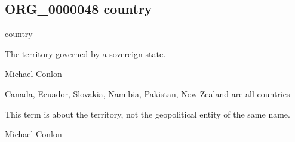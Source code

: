 \documentclass[letterpaper,10pt,english]{sphinxmanual}
\begin{document}
\subsection{ORG\_0000048 \sphinxhyphen{} country}
\label{\detokenize{doc-ORG_0000048:org-0000048-country}}\label{\detokenize{doc-ORG_0000048:index-0}}\label{\detokenize{doc-ORG_0000048::doc}}
\begin{sphinxShadowBox}

\sphinxAtStartPar
country
\end{sphinxShadowBox}

\begin{sphinxShadowBox}

\sphinxAtStartPar
{\hyperref[\detokenize{doc-ORG_0000045::doc}]{}}
\end{sphinxShadowBox}

\begin{sphinxShadowBox}

\sphinxAtStartPar
The territory governed by a sovereign state.
\end{sphinxShadowBox}

\begin{sphinxShadowBox}

\sphinxAtStartPar
Michael Conlon 
\end{sphinxShadowBox}

\begin{sphinxShadowBox}

\sphinxAtStartPar
Canada, Ecuador, Slovakia, Namibia, Pakistan, New Zealand are all countries
\end{sphinxShadowBox}

\begin{sphinxShadowBox}

\sphinxAtStartPar
This term is about the territory, not the geopolitical entity of the same name.
\end{sphinxShadowBox}

\begin{sphinxShadowBox}

\sphinxAtStartPar
Michael Conlon 
\end{sphinxShadowBox}
\begin{quote}

\ignorespaces \end{quote}
\end{document}
